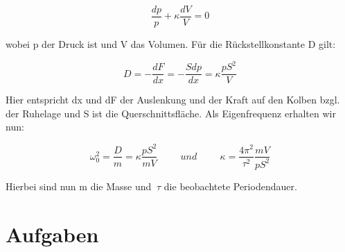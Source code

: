 \documentclass{article}
\begin{document}
{{\begin{equation}
\frac{dp}{p}+\kappa \frac{dV}{V}=0
\end{equation}

wobei p der Druck ist und V das Volumen. Für die Rückstellkonstante D gilt:

\begin{equation}
D=-\frac{dF}{dx}=-\frac{Sdp}{dx}=\kappa \frac{pS^2}{V}
\end{equation}

Hier entspricht dx und dF der Auslenkung und der Kraft auf den Kolben bzgl. der Ruhelage und S ist die Querschnittsfläche. Als Eigenfrequenz erhalten wir nun:

\begin{equation}
\label{25}
\omega_{0}^2=\frac{D}{m}=\kappa \frac{pS^2}{mV} \hspace{1cm} und \hspace{1cm} \kappa =\frac{4\pi ^2}{\tau ^2} \frac{mV}{pS^2}
\end{equation}

Hierbei sind nun m die Masse und \(\ \tau\) die beobachtete Periodendauer.

{\begin{center}
\begin{minipage}{\linewidth}
\centering
{}
\label{wtd}
\end{minipage}
\end{center}

\section{Aufgaben}
}}}
\end{document}
